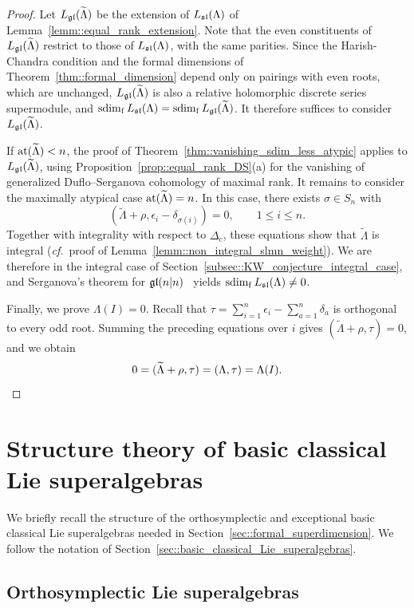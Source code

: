\begin{proof}
Let $L_{\gl}(\widetilde{\Lambda})$ be the extension of $L_{\sl}(\Lambda)$ of Lemma~\ref{lemm::equal_rank_extension}. Note that the even constituents of
$L_{\gl}(\widetilde\Lambda)$ restrict to those of $L_{\sl}(\Lambda)$,
with the same parities. Since the Harish-Chandra condition and the formal
dimensions of Theorem~\ref{thm::formal_dimension} depend only on pairings
with even roots, which are unchanged, $L_{\gl}(\widetilde\Lambda)$
is also a relative holomorphic discrete series supermodule, and
$\fsdim L_{\sl}(\Lambda)=\fsdim L_{\gl}(\widetilde\Lambda)$. It therefore suffices to consider $L_{\gl}(\widetilde\Lambda)$.

If $\at(\widetilde\Lambda)<n$, the proof of
Theorem~\ref{thm::vanishing_sdim_less_atypic} applies to
$L_{\gl}(\widetilde\Lambda)$, using Proposition~\ref{prop::equal_rank_DS}(a)
for the vanishing of generalized Duflo--Serganova cohomology of maximal
rank. It remains to consider the maximally atypical case $\at(\widetilde\Lambda)=n$. In this case, there exists $\sigma\in S_n$ with
\[
(\widetilde\Lambda+\rho,\epsilon_i-\delta_{\sigma(i)})=0,
\qquad 1\leq i\leq n.
\]
Together with integrality with respect to $\Delta_{c}$, these equations show that
$\widetilde\Lambda$ is integral (\emph{cf.}~proof of Lemma~\ref{lemm::non_integral_slmn_weight}). We are therefore in the integral case of
Section~\ref{subsec::KW_conjecture_integral_case}, and Serganova's
theorem for $\gl(n\vert n)$~\cite{serganova2011superdimension} yields
$\fsdim L_{\sl}(\Lambda)\neq0$.

Finally, we prove $\Lambda(I)=0$. Recall that $\tau=\sum_{i=1}^n\epsilon_i-\sum_{a=1}^n\delta_a$ is orthogonal to every odd root. Summing the preceding equations over $i$ gives $(\widetilde\Lambda+\rho,\tau)=0$, and we obtain 
\[
0=(\widetilde{\Lambda}+\rho,\tau)=(\Lambda,\tau)=\Lambda(I).\qedhere
\]
\end{proof}


\appendix
\section{Structure theory of basic classical Lie superalgebras}\label{appendix::structure_theory}
\noindent We briefly recall the structure of the orthosymplectic and exceptional basic classical Lie superalgebras needed in Section~\ref{sec::formal_superdimension}. We follow the notation of Section~\ref{sec::basic_classical_Lie_superalgebras}.


\subsection{Orthosymplectic Lie superalgebras} \label{subsec::appendix_osp}

